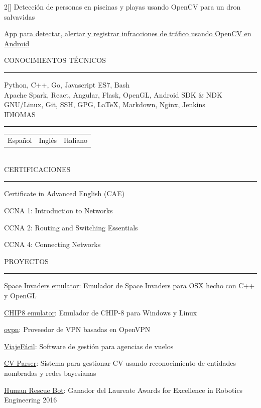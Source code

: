 \documentclass[a4paper, 12pt]{article}
\newenvironment{myparacol}[2][]{%
\begin{paracol}{#2}[#1]\setlength{\parindent}{0pt}}{%
\end{paracol}}
\begin{document}
\begin{sloppypar}
\begin{myparacol}{2}
    Detección de personas en piscinas y playas usando OpenCV para un dron salvavidas

    \href{https://github.com/hugo19941994/infrac-coche}{App para detectar, alertar y registrar infracciones de tráfico usando OpenCV en Android}
    \\

    \switchcolumn{}

    CONOCIMIENTOS TÉCNICOS
    \vspace{1mm}
    \hrule
    \kern9pt

    Python, C++, Go, Javascript ES7, Bash\\

    Apache Spark, React, Angular, Flask, OpenGL, Android SDK \& NDK\\

    GNU/Linux, Git, SSH, GPG, \LaTeX, Markdown, Nginx, Jenkins\\

    IDIOMAS
    \vspace{1mm}
    \hrule
    \kern9pt
    \noindent\begin{tabularx}{\columnwidth}{ @{} X X X }
        Español & Inglés & Italiano
    \end{tabularx}
    \\

    CERTIFICACIONES
    \vspace{1mm}
    \hrule
    \kern9pt
    Certificate in Advanced English (CAE)

    CCNA 1: Introduction to Networks

    CCNA 2: Routing and Switching Essentials

    CCNA 4: Connecting Networks

    \switchcolumn{}

    \noindent PROYECTOS
    \vspace{1mm}
    \hrule
    \kern9pt
    \href{https://github.com/hugo19941994/space-invaders-emu}{Space Invaders emulator}: Emulador de Space Invaders para OSX hecho con C++ y OpenGL

    \href{https://github.com/hugo19941994/chip8-emu}{CHIP8 emulator}: Emulador de CHIP-8 para Windows y Linux

    \href{https://vpn.hugofs.com}{ovpn}: Proveedor de VPN basadas en OpenVPN

    \href{https://github.com/hugo19941994/ViajeFacil}{ViajeFácil}: Software de gestión para agencias de vuelos

    \href{https://github.com/hugo19941994/cv-parser}{CV Parser}: Sistema para gestionar CV usando reconocimiento de entidades nombradas y redes bayesianas

    \href{https://github.com/hugo19941994/robot}{Human Rescue Bot}: Ganador del Laureate Awards for Excellence in Robotics Engineering 2016

\end{myparacol}
\end{sloppypar}
\end{document}
